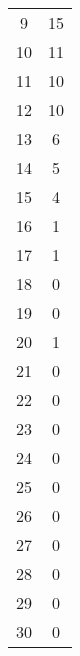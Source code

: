 \begin{tabular}{S[table-format=2.0] S[table-format=3.0]}
          9 &  15 \\
         10 &  11 \\
         11 &  10 \\
         12 &  10 \\
         13 &   6 \\
         14 &   5 \\
         15 &   4 \\
         16 &   1 \\
         17 &   1 \\
         18 &   0 \\
         19 &   0 \\
         20 &   1 \\
         21 &   0 \\
         22 &   0 \\
         23 &   0 \\
         24 &   0 \\
         25 &   0 \\
         26 &   0 \\
         27 &   0 \\
         28 &   0 \\
         29 &   0 \\
         30 &   0 \\
        \bottomrule
    \end{tabular}
